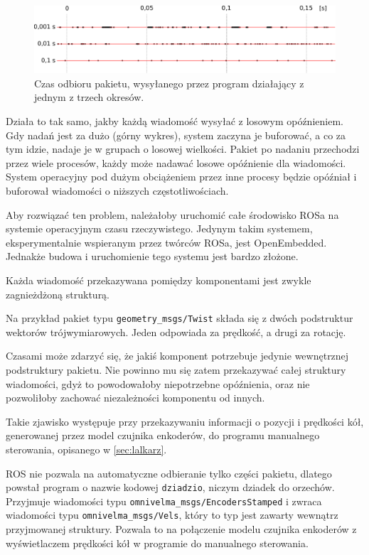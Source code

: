 	\begin{figure}[H]
	\centering
	\includegraphics[width=\textwidth]{graphics/gramofon.pdf}
	\caption{Czas odbioru pakietu, wysyłanego przez program działający z jednym z trzech okresów.}
	\end{figure}
	
	Działa to tak samo, jakby każdą wiadomość wysyłać z losowym opóźnieniem.
	Gdy nadań jest za dużo (górny wykres), system zaczyna je buforować, a co za tym idzie, nadaje je w grupach o losowej wielkości.
	Pakiet po nadaniu przechodzi przez wiele procesów, każdy może nadawać losowe opóźnienie dla wiadomości.
	System operacyjny pod dużym obciążeniem przez inne procesy będzie opóźniał i buforował wiadomości o niższych częstotliwościach.
	
	Aby rozwiązać ten problem, należałoby uruchomić całe środowisko ROSa na systemie operacyjnym czasu rzeczywistego.
	Jedynym takim systemem, eksperymentalnie wspieranym przez twórców ROSa, jest OpenEmbedded.
	Jednakże budowa i uruchomienie tego systemu jest bardzo złożone.
	
	Każda wiadomość przekazywana pomiędzy komponentami jest zwykle zagnieżdżoną strukturą.
	
	
	Na przykład pakiet typu \texttt{geometry\_msgs/Twist} składa się z dwóch podstruktur wektorów trójwymiarowych.
	Jeden odpowiada za prędkość, a drugi za rotację.
	
	Czasami może zdarzyć się, że jakiś komponent potrzebuje jedynie wewnętrznej podstruktury pakietu.
	Nie powinno mu się zatem przekazywać całej struktury wiadomości, gdyż to powodowałoby niepotrzebne opóźnienia, oraz nie pozwoliłoby zachować niezależności 
	komponentu od innych.
	
	Takie zjawisko występuje przy przekazywaniu informacji o pozycji i prędkości kół, generowanej przez model czujnika enkoderów, do programu
	manualnego sterowania, opisanego w \ref{sec:lalkarz}.
	
	ROS nie pozwala na automatyczne odbieranie tylko części pakietu, dlatego powstał program o nazwie kodowej \texttt{dziadzio}, niczym dziadek do orzechów.
	Przyjmuje wiadomości typu \texttt{omnivelma\_msgs/EncodersStamped} i zwraca wiadomości typu \texttt{omnivelma\_msgs/Vels}, który to typ 
	jest zawarty wewnątrz przyjmowanej struktury. Pozwala to na połączenie modelu czujnika enkoderów z wyświetlaczem prędkości kół w programie do manualnego sterowania.
	
